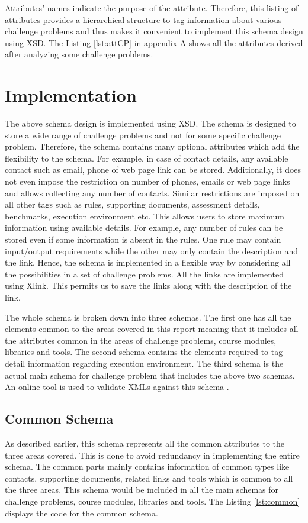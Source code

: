 \documentclass[11pt,letterpaper]{report}
\begin{document}
Attributes' names indicate the purpose of the attribute. Therefore, this listing of attributes provides a hierarchical structure to tag information about various challenge problems and thus makes it convenient to implement this schema design using XSD. The Listing \ref{lst:attCP} in appendix A shows all the attributes derived after analyzing some challenge problems.

\section*{Implementation}
The above schema design is implemented using XSD. The schema is designed to store a wide range of challenge problems and not for some specific challenge problem. Therefore, the schema contains many optional attributes which add the flexibility to the schema. For example, in case of contact details, any available contact such as email, phone of web page link can be stored. Additionally, it does not even impose the restriction on number of phones, emails or web page links and allows collecting any number of contacts. Similar restrictions are imposed on all other tags such as rules, supporting documents, assessment details, benchmarks, execution environment etc. This allows users to store maximum information using available details. For example, any number of rules can be stored even if some information is absent in the rules. One rule may contain input/output requirements while the other may only contain the description and the link. Hence, the schema is implemented in a flexible way by considering all the possibilities in a set of challenge problems. All the links are implemented using Xlink. This permits us to save the links along with the description of the link.    

The whole schema is broken down into three schemas. The first one has all the elements common to the areas covered in this report meaning that it includes all the attributes common in the areas of challenge problems, course modules, libraries and tools. The second schema contains the elements required to tag detail information regarding execution environment. The third schema is the actual main schema for challenge problem that includes the above two schemas. An online tool is used to validate XMLs against this schema \cite{olXSD}.

\subsection*{Common Schema}
As described earlier, this schema represents all the common attributes to the three areas covered. This is done to avoid redundancy in implementing the entire schema. The common parts mainly contains information of common types like contacts, supporting documents, related links and tools which is common to all the three areas. This schema would be included in all the main schemas for challenge problems, course modules, libraries and tools. The Listing \ref{lst:common} displays the code for the common schema.     
\end{document}

